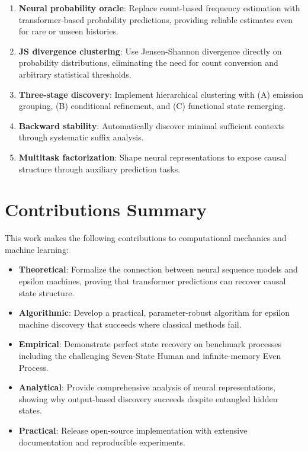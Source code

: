 \documentclass[11pt,a4paper]{report}
\theoremstyle{definition}
\begin{document}
\begin{keyresult}
\begin{enumerate}
    \item \textbf{Neural probability oracle}: Replace count-based frequency estimation with transformer-based probability predictions, providing reliable estimates even for rare or unseen histories.
    
    \item \textbf{JS divergence clustering}: Use Jensen-Shannon divergence directly on probability distributions, eliminating the need for count conversion and arbitrary statistical thresholds.
    
    \item \textbf{Three-stage discovery}: Implement hierarchical clustering with (A) emission grouping, (B) conditional refinement, and (C) functional state remerging.
    
    \item \textbf{Backward stability}: Automatically discover minimal sufficient contexts through systematic suffix analysis.
    
    \item \textbf{Multitask factorization}: Shape neural representations to expose causal structure through auxiliary prediction tasks.
\end{enumerate}
\end{keyresult}

\section{Contributions Summary}
\label{sec:contributions}

This work makes the following contributions to computational mechanics and machine learning:

\begin{itemize}
    \item \textbf{Theoretical}: Formalize the connection between neural sequence models and epsilon machines, proving that transformer predictions can recover causal state structure.
    
    \item \textbf{Algorithmic}: Develop a practical, parameter-robust algorithm for epsilon machine discovery that succeeds where classical methods fail.
    
    \item \textbf{Empirical}: Demonstrate perfect state recovery on benchmark processes including the challenging Seven-State Human and infinite-memory Even Process.
    
    \item \textbf{Analytical}: Provide comprehensive analysis of neural representations, showing why output-based discovery succeeds despite entangled hidden states.
    
    \item \textbf{Practical}: Release open-source implementation with extensive documentation and reproducible experiments.
\end{itemize}
\end{document}
